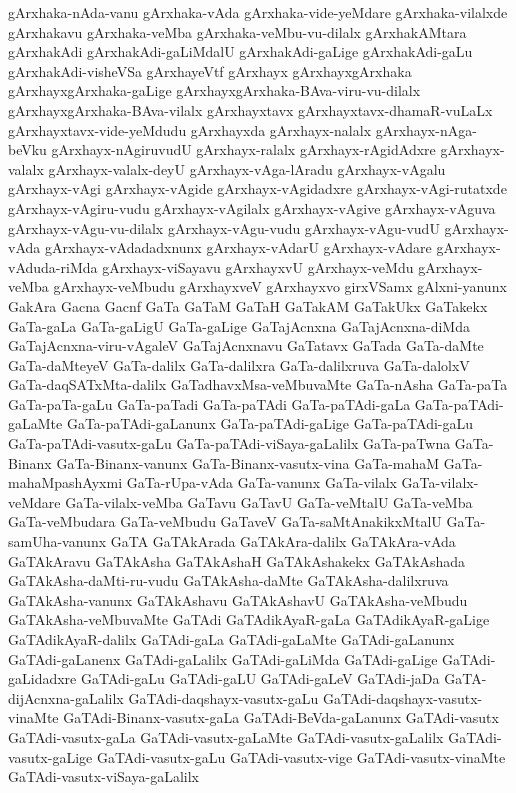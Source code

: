 {gArxhaka-nAda-vanu
gArxhaka-vAda
gArxhaka-vide-yeMdare
gArxhaka-vilalxde
gArxhakavu
gArxhaka-veMba
gArxhaka-veMbu-vu-dilalx
gArxhakAMtara
gArxhakAdi
gArxhakAdi-gaLiMdalU
gArxhakAdi-gaLige
gArxhakAdi-gaLu
gArxhakAdi-visheVSa
gArxhayeVtf
gArxhayx
gArxhayxgArxhaka
gArxhayxgArxhaka-gaLige
gArxhayxgArxhaka-BAva-viru-vu-dilalx
gArxhayxgArxhaka-BAva-vilalx
gArxhayxtavx
gArxhayxtavx-dhamaR-vuLaLx
gArxhayxtavx-vide-yeMdudu
gArxhayxda
gArxhayx-nalalx
gArxhayx-nAga-beVku
gArxhayx-nAgiruvudU
gArxhayx-ralalx
gArxhayx-rAgidAdxre
gArxhayx-valalx
gArxhayx-valalx-deyU
gArxhayx-vAga-lAradu
gArxhayx-vAgalu
gArxhayx-vAgi
gArxhayx-vAgide
gArxhayx-vAgidadxre
gArxhayx-vAgi-rutatxde
gArxhayx-vAgiru-vudu
gArxhayx-vAgilalx
gArxhayx-vAgive
gArxhayx-vAguva
gArxhayx-vAgu-vu-dilalx
gArxhayx-vAgu-vudu
gArxhayx-vAgu-vudU
gArxhayx-vAda
gArxhayx-vAdadadxnunx
gArxhayx-vAdarU
gArxhayx-vAdare
gArxhayx-vAduda-riMda
gArxhayx-viSayavu
gArxhayxvU
gArxhayx-veMdu
gArxhayx-veMba
gArxhayx-veMbudu
gArxhayxveV
gArxhayxvo
girxVSamx
gAlxni-yanunx
GakAra
Gacna
Gacnf
GaTa
GaTaM
GaTaH
GaTakAM
GaTakUkx
GaTakekx
GaTa-gaLa
GaTa-gaLigU
GaTa-gaLige
GaTajAcnxna
GaTajAcnxna-diMda
GaTajAcnxna-viru-vAgaleV
GaTajAcnxnavu
GaTatavx
GaTada
GaTa-daMte
GaTa-daMteyeV
GaTa-dalilx
GaTa-dalilxra
GaTa-dalilxruva
GaTa-dalolxV
GaTa-daqSATxMta-dalilx
GaTadhavxMsa-veMbuvaMte
GaTa-nAsha
GaTa-paTa
GaTa-paTa-gaLu
GaTa-paTadi
GaTa-paTAdi
GaTa-paTAdi-gaLa
GaTa-paTAdi-gaLaMte
GaTa-paTAdi-gaLanunx
GaTa-paTAdi-gaLige
GaTa-paTAdi-gaLu
GaTa-paTAdi-vasutx-gaLu
GaTa-paTAdi-viSaya-gaLalilx
GaTa-paTwna
GaTa-Binanx
GaTa-Binanx-vanunx
GaTa-Binanx-vasutx-vina
GaTa-mahaM
GaTa-mahaMpashAyxmi
GaTa-rUpa-vAda
GaTa-vanunx
GaTa-vilalx
GaTa-vilalx-veMdare
GaTa-vilalx-veMba
GaTavu
GaTavU
GaTa-veMtalU
GaTa-veMba
GaTa-veMbudara
GaTa-veMbudu
GaTaveV
GaTa-saMtAnakikxMtalU
GaTa-samUha-vanunx
GaTA
GaTAkArada
GaTAkAra-dalilx
GaTAkAra-vAda
GaTAkAravu
GaTAkAsha
GaTAkAshaH
GaTAkAshakekx
GaTAkAshada
GaTAkAsha-daMti-ru-vudu
GaTAkAsha-daMte
GaTAkAsha-dalilxruva
GaTAkAsha-vanunx
GaTAkAshavu
GaTAkAshavU
GaTAkAsha-veMbudu
GaTAkAsha-veMbuvaMte
GaTAdi
GaTAdikAyaR-gaLa
GaTAdikAyaR-gaLige
GaTAdikAyaR-dalilx
GaTAdi-gaLa
GaTAdi-gaLaMte
GaTAdi-gaLanunx
GaTAdi-gaLanenx
GaTAdi-gaLalilx
GaTAdi-gaLiMda
GaTAdi-gaLige
GaTAdi-gaLidadxre
GaTAdi-gaLu
GaTAdi-gaLU
GaTAdi-gaLeV
GaTAdi-jaDa
GaTA-dijAcnxna-gaLalilx
GaTAdi-daqshayx-vasutx-gaLu
GaTAdi-daqshayx-vasutx-vinaMte
GaTAdi-Binanx-vasutx-gaLa
GaTAdi-BeVda-gaLanunx
GaTAdi-vasutx
GaTAdi-vasutx-gaLa
GaTAdi-vasutx-gaLaMte
GaTAdi-vasutx-gaLalilx
GaTAdi-vasutx-gaLige
GaTAdi-vasutx-gaLu
GaTAdi-vasutx-vige
GaTAdi-vasutx-vinaMte
GaTAdi-vasutx-viSaya-gaLalilx
}

